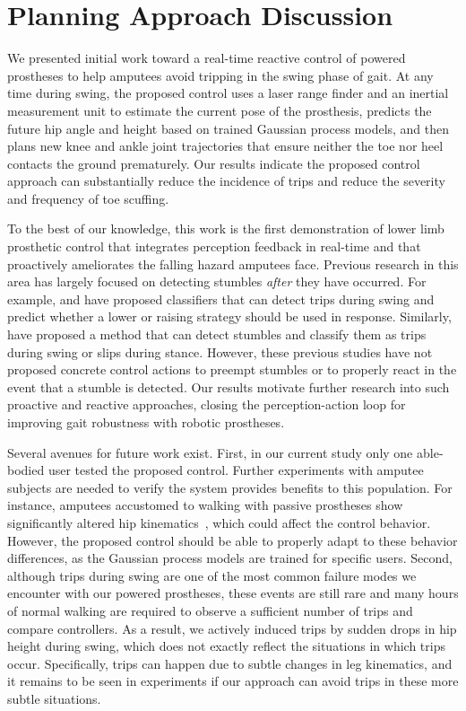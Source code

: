 \section{Planning Approach Discussion}\label{sec:swing_control_planning_discuss}

We presented initial work toward a real-time reactive control of powered
prostheses to help amputees avoid tripping in the swing phase of gait. At any
time during swing, the proposed control uses a laser range finder and an
inertial measurement unit to estimate the current pose of the prosthesis,
predicts the future hip angle and height based on trained Gaussian process
models, and then plans new knee and ankle joint trajectories that ensure neither
the toe nor heel contacts the ground prematurely. Our results indicate the
proposed control approach can substantially reduce the incidence of trips and
reduce the severity and frequency of toe scuffing.

To the best of our knowledge, this work is the first demonstration of lower limb
prosthetic control that integrates perception feedback in real-time and that
proactively ameliorates the falling hazard amputees face. Previous research in
this area has largely focused on detecting stumbles \emph{after} they have
occurred. For example, \citet{lawson2010stumble} and \citet{shirota2014recovery}
have proposed classifiers that can detect trips during swing and predict whether
a lower or raising strategy should be used in response. Similarly,
\citet{zhang2011towards} have proposed a method that can detect stumbles and
classify them as trips during swing or slips during stance. However, these
previous studies have not proposed concrete control actions to preempt stumbles
or to properly react in the event that a stumble is detected. Our results
motivate further research into such proactive and reactive approaches, closing
the perception-action loop for improving gait robustness with robotic
prostheses.

Several avenues for future work exist. First, in our current study only one
able-bodied user tested the proposed control. Further experiments with amputee
subjects are needed to verify the system provides benefits to this population.
For instance, amputees accustomed to walking with passive prostheses show
significantly altered hip kinematics~\citep{jaegers1995prosthetic}, which could
affect the control behavior. However, the proposed control should be able to
properly adapt to these behavior differences, as the Gaussian process models are
trained for specific users. Second, although trips during swing are one of the
most common failure modes we encounter with our powered prostheses, these events
are still rare and many hours of normal walking are required to observe a
sufficient number of trips and compare controllers. As a result, we actively
induced trips by sudden drops in hip height during swing, which does not exactly
reflect the situations in which trips occur.  Specifically, trips can happen due
to subtle changes in leg kinematics, and it remains to be seen in experiments if
our approach can avoid trips in these more subtle situations.

